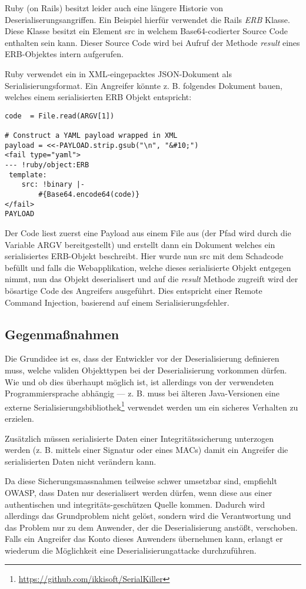 Ruby (on Rails) besitzt leider auch eine längere Historie von Deserialiserungsangriffen. Ein Beispiel hierfür verwendet die Rails \textit{ERB} Klasse. Diese Klasse besitzt ein Element src in welchem Base64-codierter Source Code enthalten sein kann. Dieser Source Code wird bei Aufruf der Methode \textit{result} eines ERB-Objektes intern aufgerufen.

Ruby verwendet ein in XML-eingepacktes JSON-Dokument als Serialisierungsformat. Ein Angreifer könnte z. B. folgendes Dokument bauen, welches einem serialisierten ERB Objekt entspricht:

\begin{verbatim}
code  = File.read(ARGV[1])

# Construct a YAML payload wrapped in XML
payload = <<-PAYLOAD.strip.gsub("\n", "&#10;")
<fail type="yaml">
--- !ruby/object:ERB
 template:
    src: !binary |-
        #{Base64.encode64(code)}
</fail>
PAYLOAD
\end{verbatim}

Der Code liest zuerst eine Payload aus einem File aus (der Pfad wird durch die Variable ARGV bereitgestellt) und erstellt dann ein Dokument welches ein serialisiertes ERB-Objekt beschreibt. Hier wurde nun src mit dem Schadcode befüllt und falls die Webapplikation, welche dieses serialisierte Objekt entgegen nimmt, nun das Objekt deserialisert und auf die \textit{result} Methode zugreift wird der bösartige Code des Angreifers ausgeführt. Dies entspricht einer Remote Command Injection, basierend auf einem Serialisierungsfehler.

\subsection{Gegenmaßnahmen}

Die Grundidee ist es, dass der Entwickler vor der Deserialisierung definieren muss, welche validen Objekttypen bei der Deserialisierung vorkommen dürfen. Wie und ob dies überhaupt möglich ist, ist allerdings von der verwendeten Programmiersprache abhängig --- z. B. muss bei älteren Java-Versionen eine externe Serialisierungsbibliothek\footnote{\url{https://github.com/ikkisoft/SerialKiller}} verwendet werden um ein sicheres Verhalten zu erzielen.

Zusätzlich müssen serialisierte Daten einer Integritätssicherung unterzogen werden (z. B. mittels einer Signatur oder eines MACs) damit ein Angreifer die serialisierten Daten nicht verändern kann.

Da diese Sicherungsmassnahmen teilweise schwer umsetzbar sind, empfiehlt OWASP, dass Daten nur deserialisert werden dürfen, wenn diese aus einer authentischen und integritäts-geschützen Quelle kommen. Dadurch wird allerdings das Grundproblem nicht gelöst, sondern wird die Verantwortung und das Problem nur zu dem Anwender, der die Deserialisierung anstößt, verschoben. Falls ein Angreifer das Konto dieses Anwenders übernehmen kann, erlangt er wiederum die Möglichkeit eine Deserialisierungattacke durchzuführen.

